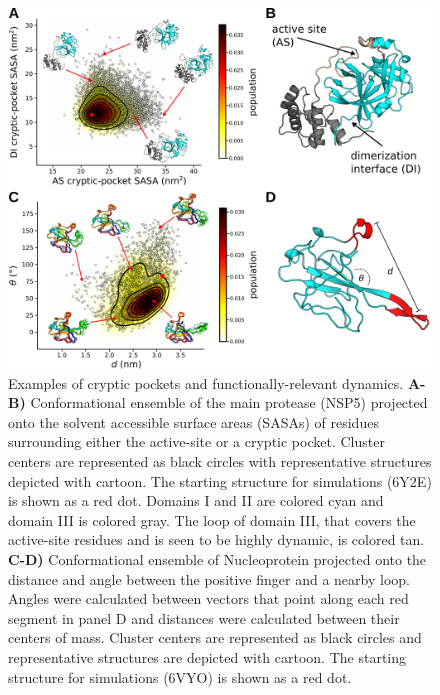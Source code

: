 \documentclass[../main.tex]{subfiles}
\begin{document}
        \begin{figure}[!htb] %
            \centering
            \includegraphics[width=6in]{ch7-fig4.png}
            \caption[Examples of cryptic pockets and functionally-relevant dynamics.]
                {Examples of cryptic pockets and functionally-relevant dynamics. \textbf{A-B)} Conformational ensemble of the main protease (NSP5) projected onto the solvent accessible surface areas (SASAs) of residues surrounding either the active-site or a cryptic pocket. Cluster centers are represented as black circles with representative structures depicted with cartoon. The starting structure for simulations (6Y2E) is shown as a red dot. Domains I and II are colored cyan and domain III is colored gray. The loop of domain III, that covers the active-site residues and is seen to be highly dynamic, is colored tan. \textbf{C-D)} Conformational ensemble of Nucleoprotein projected onto the distance and angle between the positive finger and a nearby loop. Angles were calculated between vectors that point along each red segment in panel D and distances were calculated between their centers of mass. Cluster centers are represented as black circles and representative structures are depicted with cartoon. The starting structure for simulations (6VYO) is shown as a red dot.}
            \label{fig:ch7-fig4}
        \end{figure}
\end{document}
